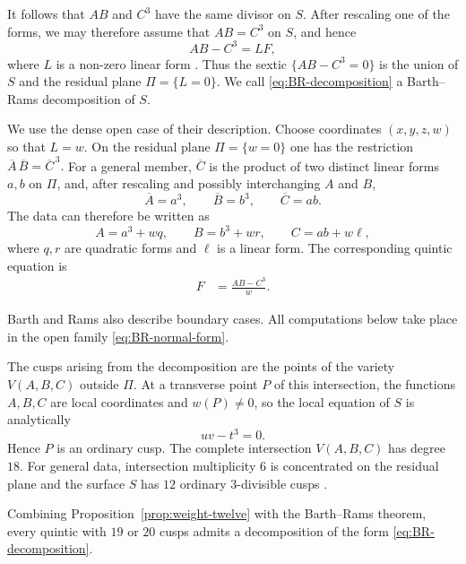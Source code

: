 \documentclass[10pt,a4paper]{article}
\begin{document}
It follows that $AB$ and $C^3$ have the same divisor on $S$.  After rescaling
one of the forms, we may therefore assume that $AB=C^3$ on $S$, and hence
\begin{equation}
 \label{eq:BR-decomposition}
        AB-C^3=LF,
\end{equation}
where $L$ is a non-zero linear form
\cite[Lemma~2.1\,(b)]{BarthRams_equations}.  Thus the sextic
$\{AB-C^3=0\}$ is the union of $S$ and the residual plane
$\Pi=\{L=0\}$.
We call \eqref{eq:BR-decomposition} a Barth--Rams decomposition of $S$.

We use the dense open case of their description.  Choose coordinates $(x,y,z,w)$ so that
$L=w$.  On the residual plane $\Pi=\{w=0\}$ one has the restriction
$\overline A\,\overline B=\overline C^{\,3}.$
For a general member, $\overline C$ is the product of two distinct linear
forms $a,b$ on $\Pi$, and, after rescaling and possibly interchanging $A$ and
$B$,
\[
        \overline A=a^3,
        \qquad
        \overline B=b^3,
        \qquad
        \overline C=ab.
\]
The data can therefore be written as
\begin{equation}
 \label{eq:BR-normal-form}
        A=a^3+wq,
        \qquad
        B=b^3+wr,
        \qquad
        C=ab+w\ell,
\end{equation}
where $q,r$ are quadratic forms and $\ell$ is a linear form.  The corresponding
quintic equation is
\begin{equation}
 \label{eq:BR-quintic}
\begin{aligned}
        F&=\frac{AB-C^3}{w}.
\end{aligned}
\end{equation}

Barth and Rams also describe boundary cases. All computations below take place
in the open family \eqref{eq:BR-normal-form}.

The cusps arising from the decomposition are the points of the variety $V(A,B,C)$
outside $\Pi$.  At a transverse point $P$ of this intersection, the functions $A,B,C$ are local
coordinates and $w(P)\ne0$, so the local equation of $S$ is analytically
\[
        uv-t^3=0.
\]
Hence $P$ is an ordinary cusp.  The complete intersection $V(A,B,C)$ has
degree $18$. For general data, intersection multiplicity $6$ is concentrated
on the residual plane and the surface $S$ has $12$ ordinary $3$-divisible cusps
\cite[Theorem~2.1]{BarthRams_equations}.

Combining Proposition~\ref{prop:weight-twelve} with the Barth--Rams theorem,
every quintic with $19$ or $20$ cusps admits a decomposition of the form
\eqref{eq:BR-decomposition}.
\end{document}
